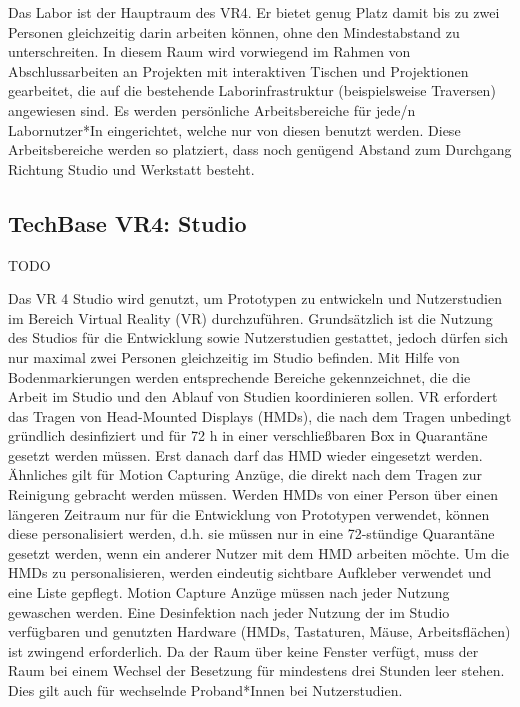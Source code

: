 
\noindent
Das Labor ist der Hauptraum des VR4.
Er bietet genug Platz damit bis zu zwei Personen gleichzeitig darin arbeiten können, ohne den Mindestabstand zu unterschreiten.
In diesem Raum wird vorwiegend im Rahmen von Abschlussarbeiten an Projekten mit interaktiven Tischen und Projektionen gearbeitet, die auf die bestehende Laborinfrastruktur (beispielsweise Traversen) angewiesen sind.
Es werden persönliche Arbeitsbereiche für jede/n Labornutzer*In eingerichtet, welche nur von diesen benutzt werden.
Diese Arbeitsbereiche werden so platziert, dass noch genügend Abstand zum Durchgang Richtung Studio und Werkstatt besteht.

\subsection{TechBase VR4: Studio}


TODO

\noindent
Das VR 4 Studio wird genutzt, um Prototypen zu entwickeln und Nutzerstudien im Bereich Virtual Reality (VR) durchzuführen.
Grundsätzlich ist die Nutzung des Studios für die Entwicklung sowie Nutzerstudien gestattet, jedoch dürfen sich nur maximal zwei Personen gleichzeitig im Studio befinden.
Mit Hilfe von Bodenmarkierungen werden entsprechende Bereiche gekennzeichnet, die die Arbeit im Studio und den Ablauf von Studien koordinieren sollen.
VR erfordert das Tragen von Head-Mounted Displays (HMDs), die nach dem Tragen unbedingt gründlich desinfiziert und für 72 h in einer verschließbaren Box in Quarantäne gesetzt werden müssen.
Erst danach darf das HMD wieder eingesetzt werden.
Ähnliches gilt für Motion Capturing Anzüge, die direkt nach dem Tragen zur Reinigung gebracht werden müssen.
Werden HMDs von einer Person über einen längeren Zeitraum nur für die Entwicklung von Prototypen verwendet, können diese personalisiert werden, d.h. sie müssen nur in eine 72-stündige Quarantäne gesetzt werden, wenn ein anderer Nutzer mit dem HMD arbeiten möchte.
Um die HMDs zu personalisieren, werden eindeutig sichtbare Aufkleber verwendet und eine Liste gepflegt.
Motion Capture Anzüge müssen nach jeder Nutzung gewaschen werden.
Eine Desinfektion nach jeder Nutzung der im Studio verfügbaren und genutzten Hardware (HMDs, Tastaturen, Mäuse, Arbeitsflächen) ist zwingend erforderlich.
Da der Raum über keine Fenster verfügt, muss der Raum bei einem Wechsel der Besetzung für mindestens drei Stunden leer stehen.
Dies gilt auch für wechselnde Proband*Innen bei Nutzerstudien.

